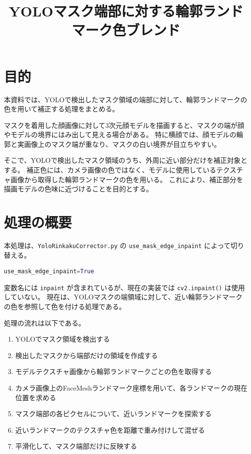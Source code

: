 \documentclass[uplatex,dvipdfmx]{jsarticle}
\title{YOLOマスク端部に対する輪郭ランドマーク色ブレンド}
\author{}
\date{}
\begin{document}
\maketitle

\section{目的}

本資料では、YOLOで検出したマスク領域の端部に対して、輪郭ランドマークの色を用いて補正する処理をまとめる。

マスクを着用した顔画像に対して3次元顔モデルを描画すると、マスクの端が顔やモデルの境界にはみ出して見える場合がある。
特に横顔では、顔モデルの輪郭と実画像上のマスク端が重なり、マスクの白い境界が目立ちやすい。

そこで、YOLOで検出したマスク領域のうち、外周に近い部分だけを補正対象とする。
補正色には、カメラ画像の色ではなく、モデルに使用しているテクスチャ画像から取得した輪郭ランドマークの色を用いる。
これにより、補正部分を描画モデルの色味に近づけることを目的とする。

\section{処理の概要}

本処理は、\texttt{YoloRinkakuCorrector.py} の \texttt{use\_mask\_edge\_inpaint} によって切り替える。

\begin{lstlisting}[language=Python]
use_mask_edge_inpaint=True
\end{lstlisting}

変数名には \texttt{inpaint} が含まれているが、現在の実装では \texttt{cv2.inpaint()} は使用していない。
現在は、YOLOマスクの端領域に対して、近い輪郭ランドマークの色を参照して色を付ける処理である。

処理の流れは以下である。

\begin{enumerate}
  \item YOLOでマスク領域を検出する
  \item 検出したマスクから端部だけの領域を作成する
  \item モデルテクスチャ画像から輪郭ランドマークごとの色を取得する
  \item カメラ画像上のFaceMeshランドマーク座標を用いて、各ランドマークの現在位置を求める
  \item マスク端部の各ピクセルについて、近いランドマークを探索する
  \item 近いランドマークのテクスチャ色を距離で重み付けして混ぜる
  \item 平滑化して、マスク端部だけに反映する
\end{enumerate}
\end{document}
